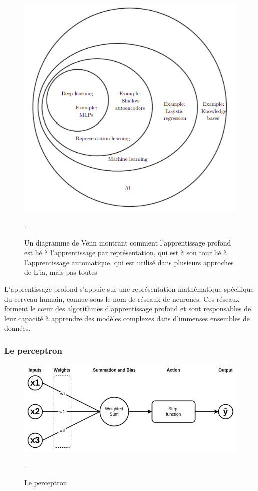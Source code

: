 \begin{figure}[H]
    \centering
    \includegraphics[width=12cm]{gfx/fig-dl-ml-ai.png}
    \caption{Un diagramme de Venn montrant comment l'apprentissage profond est lié à l'apprentissage par représentation, qui est à son tour lié à l'apprentissage automatique, qui est utilisé dans plusieurs approches de L'\ac{ia}, mais pas toutes \cite{Goodfellow-et-al-2016}}.
    \label{fig:dl-ml-ai}
\end{figure}

L'apprentissage profond s'appuie sur une représentation mathématique spécifique du cerveau humain, connue sous le nom de réseaux de neurones. Ces réseaux forment le cœur des algorithmes d'apprentissage profond et sont responsables de leur capacité à apprendre des modèles complexes dans d'immenses ensembles de données. 

\subsubsection{Le perceptron}

\begin{figure}[H]
    \centering
    \includegraphics[width=12cm]{gfx/fig-perceptron.png}
    \caption{Le perceptron}.
    \label{fig:perceptron}
\end{figure}

